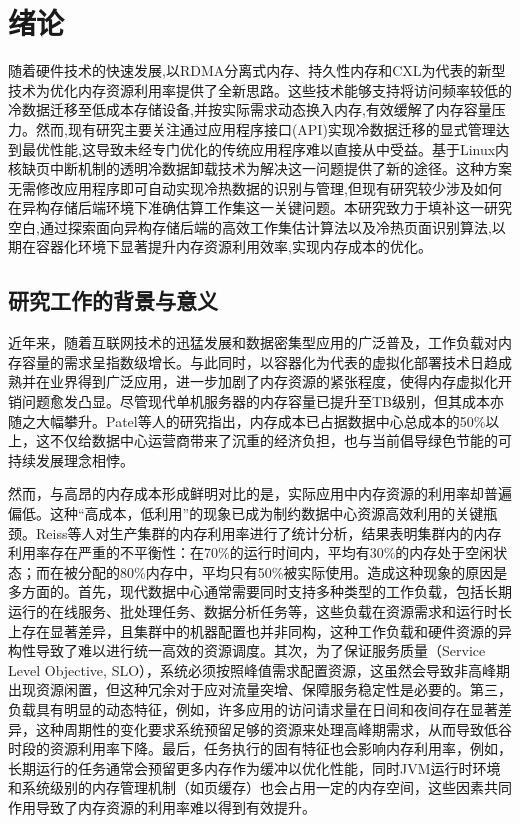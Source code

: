 \chapter{绪\hspace{6pt}论}

随着硬件技术的快速发展,以RDMA分离式内存、持久性内存和CXL为代表的新型技术为优化内存资源利用率提供了全新思路。这些技术能够支持将访问频率较低的冷数据迁移至低成本存储设备,并按实际需求动态换入内存,有效缓解了内存容量压力。然而,现有研究主要关注通过应用程序接口(API)实现冷数据迁移的显式管理达到最优性能,这导致未经专门优化的传统应用程序难以直接从中受益。基于Linux内核缺页中断机制的透明冷数据卸载技术为解决这一问题提供了新的途径。这种方案无需修改应用程序即可自动实现冷热数据的识别与管理,但现有研究较少涉及如何在异构存储后端环境下准确估算工作集这一关键问题。本研究致力于填补这一研究空白,通过探索面向异构存储后端的高效工作集估计算法以及冷热页面识别算法,以期在容器化环境下显著提升内存资源利用效率,实现内存成本的优化。

\section{研究工作的背景与意义}

近年来，随着互联网技术的迅猛发展和数据密集型应用的广泛普及，工作负载对内存容量的需求呈指数级增长。与此同时，以容器化为代表的虚拟化部署技术日趋成熟并在业界得到广泛应用，进一步加剧了内存资源的紧张程度，使得内存虚拟化开销问题愈发凸显。尽管现代单机服务器的内存容量已提升至TB级别，但其成本亦随之大幅攀升。Patel等人的研究指出，内存成本已占据数据中心总成本的50\%以上，这不仅给数据中心运营商带来了沉重的经济负担，也与当前倡导绿色节能的可持续发展理念相悖。

然而，与高昂的内存成本形成鲜明对比的是，实际应用中内存资源的利用率却普遍偏低。这种“高成本，低利用”的现象已成为制约数据中心资源高效利用的关键瓶颈。Reiss等人对生产集群的内存利用率进行了统计分析，结果表明集群内的内存利用率存在严重的不平衡性：在70\%的运行时间内，平均有30\%的内存处于空闲状态；而在被分配的80\%内存中，平均只有50\%被实际使用。造成这种现象的原因是多方面的。首先，现代数据中心通常需要同时支持多种类型的工作负载，包括长期运行的在线服务、批处理任务、数据分析任务等，这些负载在资源需求和运行时长上存在显著差异，且集群中的机器配置也并非同构，这种工作负载和硬件资源的异构性导致了难以进行统一高效的资源调度。其次，为了保证服务质量（Service Level Objective, SLO），系统必须按照峰值需求配置资源，这虽然会导致非高峰期出现资源闲置，但这种冗余对于应对流量突增、保障服务稳定性是必要的。第三，负载具有明显的动态特征，例如，许多应用的访问请求量在日间和夜间存在显著差异，这种周期性的变化要求系统预留足够的资源来处理高峰期需求，从而导致低谷时段的资源利用率下降。最后，任务执行的固有特征也会影响内存利用率，例如，长期运行的任务通常会预留更多内存作为缓冲以优化性能，同时JVM运行时环境和系统级别的内存管理机制（如页缓存）也会占用一定的内存空间，这些因素共同作用导致了内存资源的利用率难以得到有效提升。

